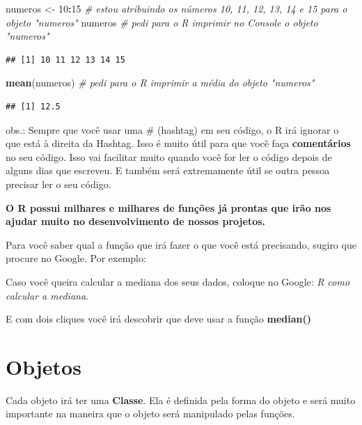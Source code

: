 \documentclass[
]{book}
\newenvironment{Shaded}{\begin{snugshade}}{\end{snugshade}}
\newcommand{\CommentTok}[1]{\textcolor[rgb]{0.56,0.35,0.01}{\textit{#1}}}
\newcommand{\DecValTok}[1]{\textcolor[rgb]{0.00,0.00,0.81}{#1}}
\newcommand{\KeywordTok}[1]{\textcolor[rgb]{0.13,0.29,0.53}{\textbf{#1}}}
\newcommand{\NormalTok}[1]{#1}
\newcommand{\OperatorTok}[1]{\textcolor[rgb]{0.81,0.36,0.00}{\textbf{#1}}}
\newcommand{\StringTok}[1]{\textcolor[rgb]{0.31,0.60,0.02}{#1}}
\begin{document}
\begin{Shaded}
\begin{Highlighting}[]
\NormalTok{numeros <-}\StringTok{ }\DecValTok{10}\OperatorTok{:}\DecValTok{15}  \CommentTok{# estou atribuindo os números 10, 11, 12, 13, 14 e 15 para o objeto "numeros"}
\NormalTok{numeros           }\CommentTok{# pedi para o R imprimir no Console o objeto "numeros" }
\end{Highlighting}
\end{Shaded}

\begin{verbatim}
## [1] 10 11 12 13 14 15
\end{verbatim}

\begin{Shaded}
\begin{Highlighting}[]
\KeywordTok{mean}\NormalTok{(numeros)     }\CommentTok{# pedi para o R imprimir a média do objeto "numeros"}
\end{Highlighting}
\end{Shaded}

\begin{verbatim}
## [1] 12.5
\end{verbatim}

obs.: Sempre que você usar uma \# (hashtag) em seu código, o R irá
ignorar o que está à direita da Hashtag. Isso é muito útil para que você
faça \textbf{comentários} no seu código. Isso vai facilitar muito quando
você for ler o código depois de alguns dias que escreveu. E também será
extremamente útil se outra pessoa precisar ler o seu código.

\textbf{O R possui milhares e milhares de funções já prontas que irão
nos ajudar muito no desenvolvimento de nossos projetos.}

Para você saber qual a função que irá fazer o que você está precisando,
sugiro que procure no Google. Por exemplo:

Caso você queira calcular a mediana dos seus dados, coloque no Google:
\emph{R como calcular a mediana}.

E com dois cliques você irá descobrir que deve usar a função
\textbf{median()}

\hypertarget{objetos}{%
\section{Objetos}\label{objetos}}

Cada objeto irá ter uma \textbf{Classe}. Ela é definida pela forma do
objeto e será muito importante na maneira que o objeto será manipulado
pelas funções.
\end{document}

